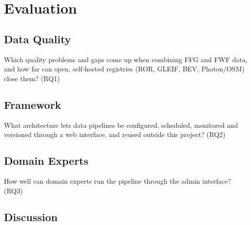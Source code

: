 \chapter{Evaluation}



\section{Data Quality}

Which quality problems and gaps come up when combining FFG and FWF data, and how far can open, self-hosted registries
(ROR, GLEIF, BEV, Photon/OSM) close them? (RQ1)


\section{Framework}

What architecture lets data pipelines be configured, scheduled, monitored and versioned through a web interface, and
reused outside this project? (RQ2)



\section{Domain Experts}

How well can domain experts run the pipeline through the admin interface? (RQ3)


\section{Discussion}

